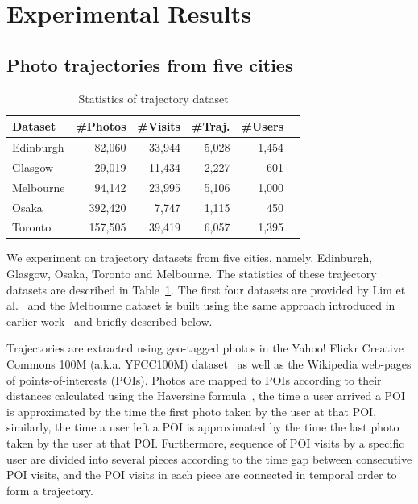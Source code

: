 
\section{Experimental Results}
\label{sec:experiment}
\secmoveup

\subsection{Photo trajectories from five cities}
\label{sec:dataset}
\secmoveup

\begin{table}
\caption{Statistics of trajectory dataset}
\label{tab:data}
\centering
\begin{tabular}{l*{5}{r}} \hline
\textbf{Dataset} & \textbf{\#Photos} & \textbf{\#Visits} & \textbf{\#Traj.} & \textbf{\#Users} \\ \hline
Edinburgh & 82,060 & 33,944 & 5,028 & 1,454 \\
Glasgow & 29,019 & 11,434 & 2,227 & 601 \\
Melbourne & 94,142 & 23,995 & 5,106 & 1,000 \\
Osaka & 392,420 & 7,747 & 1,115 & 450 \\
Toronto & 157,505 & 39,419 & 6,057 & 1,395 \\
\hline
\end{tabular}\captionmoveup
\end{table}


We experiment on trajectory datasets from five cities, namely, Edinburgh, Glasgow, Osaka, Toronto and Melbourne.
The statistics of these trajectory datasets are described in Table~\ref{tab:data}.
The first four datasets are provided by Lim et al.~\cite{ijcai15} and the Melbourne dataset is built using
the same approach introduced in earlier work~\cite{ht10, ijcai15} and briefly described below.

Trajectories are extracted using  geo-tagged photos in the Yahoo! Flickr Creative Commons 100M
(a.k.a. YFCC100M) dataset~\cite{thomee2016yfcc100m} as well as the Wikipedia web-pages of points-of-interests (POIs).
Photos are mapped to POIs according to their distances calculated using the Haversine formula~\cite{haversine},
the time a user arrived a POI is approximated by the time the first photo taken by the user at that POI,
similarly, the time a user left a POI is approximated by the time the last photo taken
by the user at that POI.
Furthermore, sequence of POI visits by a specific user are divided into several pieces according to
the time gap between consecutive POI visits, and the POI visits in each piece are connected in temporal order
to form a trajectory.


